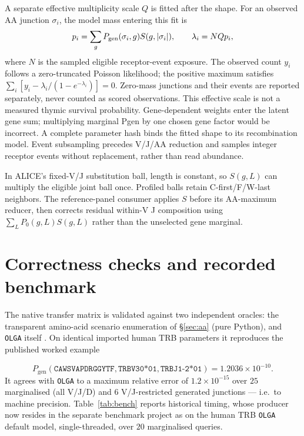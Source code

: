 \documentclass[11pt]{article}
\theoremstyle{oldplain}
\theoremstyle{oldrem}
\newcommand{\Pgen}{P_{\mathrm{gen}}}
\begin{document}
A separate effective multiplicity scale $Q$ is fitted after the shape. For an
observed AA junction $\sigma_i$, the model mass entering this fit is
\begin{equation}
 p_i=\sum_g P_{\rm gen}(\sigma_i,g)S(g,|\sigma_i|),\qquad
 \lambda_i=NQp_i,
\end{equation}
where $N$ is the sampled eligible receptor-event exposure. The observed count
$y_i$ follows a zero-truncated Poisson likelihood; the positive maximum satisfies
$\sum_i[y_i-\lambda_i/(1-e^{-\lambda_i})]=0$. Zero-mass junctions and their events
are reported separately, never counted as scored observations. This effective
scale is not a measured thymic survival probability. Gene-dependent weights
enter the latent gene sum; multiplying marginal Pgen by one chosen gene factor
would be incorrect. A complete parameter hash binds the fitted shape to its
recombination model. Event subsampling precedes V/J/AA reduction and samples
integer receptor events without replacement, rather than read abundance.

In ALICE's fixed-V/J substitution ball, length is constant, so $S(g,L)$ can
multiply the eligible joint ball once. Profiled balls retain C-first/F/W-last
neighbors. The reference-panel consumer applies $S$ before its AA-maximum
reducer, then corrects residual within-V J composition using
$\sum_L P_0(g,L)S(g,L)$ rather than the unselected gene marginal.

\section{Correctness checks and recorded benchmark}\label{sec:bench}

The native transfer matrix is validated against two independent oracles: the transparent
amino-acid scenario enumeration of \S\ref{sec:aa} (pure Python), and \texttt{OLGA} itself
\cite{Sethna2019}. On identical imported human TRB parameters it reproduces the published worked example

\begin{equation*}
 \Pgen(\texttt{CAWSVAPDRGGYTF},\texttt{TRBV30*01},\texttt{TRBJ1-2*01})
 =1.2036\times10^{-10}.
\end{equation*}
It agrees
with \texttt{OLGA} to a maximum relative error of $1.2\times10^{-15}$ over $25$ marginalised (all V/J/D)
and $6$ V/J-restricted generated junctions --- i.e.\ to machine precision. Table~\ref{tab:bench} reports
historical timing, whose producer now resides in the separate benchmark project as
 on the human TRB \texttt{OLGA} default model,
single-threaded, over $20$ marginalised queries.
\end{document}
